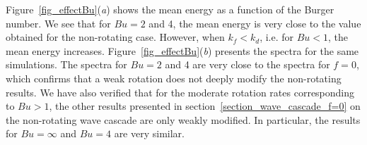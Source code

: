 Figure~\ref{fig_effectBu}(\textit{a}) shows the mean energy as a
function of the Burger number.  We see that for $Bu = 2$ and 4, the
mean energy is very close to the value obtained for the non-rotating
case.
%
However, when $k_f<k_d$, i.e. for $Bu<1$, the mean energy increases.
%
Figure~\ref{fig_effectBu}(\textit{b}) presents the spectra for the
same simulations.  The spectra for $Bu = 2$ and 4 are very close to
the spectra for $f= 0$, which confirms that a weak rotation does not
deeply modify the non-rotating results.
%
We have also verified that for the moderate rotation rates
corresponding to $Bu>1$, the other results presented in
section~\ref{section_wave_cascade_f=0} on the non-rotating wave
cascade are only weakly modified.  In particular, the results for $Bu
= \infty$ and $Bu = 4$ are very similar.
